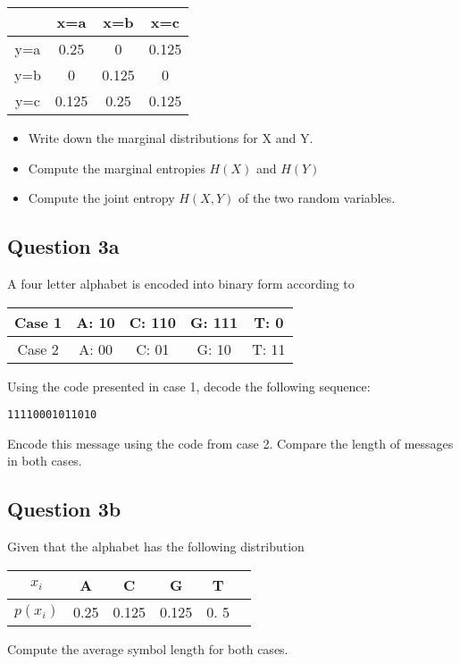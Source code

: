 \documentclass[a4paper,12pt]{article}
\begin{document}
\begin{center}
\begin{tabular}{|c|c|c|c|}
\hline
	&	x=a	&	x=b	&	x=c	\\ \hline
y=a	&	0.25	&	0	&	0.125	\\ \hline
y=b	&	0	&	0.125	&	0	\\ \hline
y=c	&	0.125	&	0.25	&	0.125	\\ \hline
\end{tabular} 
\end{center}

\begin{itemize}
\item Write down the marginal distributions for X and Y.

\item Compute the marginal entropies $H(X)$ and $H(Y)$

\item Compute the joint entropy $H(X,Y)$ of the two random variables.
\end{itemize}
\newpage
\subsection*{Question 3a}
A four letter alphabet is encoded into binary form according to
\begin{center}
\begin{tabular}{|c|c|c|c|c|}
\hline Case 1	&	A:  10 	&	C:  110	&	G:  111 &	T:  0  \\ \hline
Case 2	&	A:  00	&	C:  01	&		G: 10	&	T: 11	\\ \hline
\end{tabular} 
\end{center}
Using the code presented in case 1, decode the following sequence:
\begin{verbatim}	
11110001011010
\end{verbatim}

\noindent Encode this message using the code from case 2. Compare the length of messages in both cases.

\subsection*{Question 3b}
Given that the alphabet has the following distribution 
\begin{center}
\begin{tabular}{|c|c|c|c|c|c|}
\hline
$x_i$	& A	& C	& G	& T \\ \hline
$p(x_i)$	& 0.25	& 0.125	& 0.125	& 0. 5 \\ \hline
\end{tabular} 
\end{center}
Compute the average symbol length for both cases.
\end{document}

